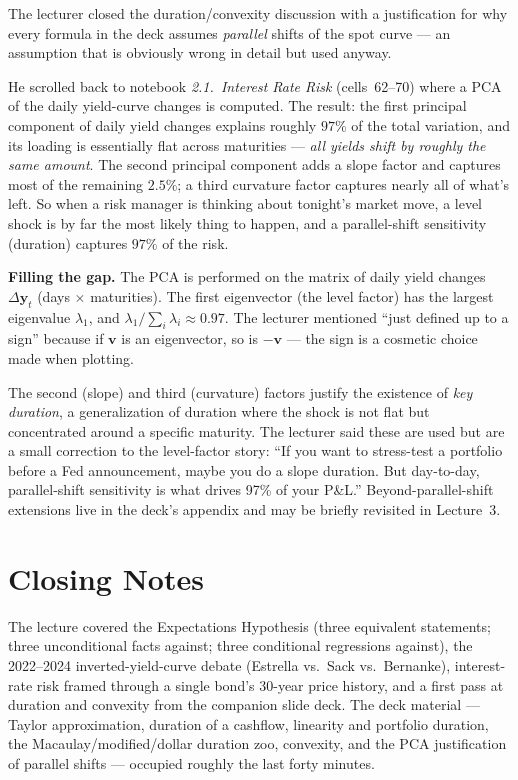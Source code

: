 The lecturer closed the duration/convexity discussion with a justification for
why every formula in the deck assumes \emph{parallel} shifts of the spot
curve --- an assumption that is obviously wrong in detail but used anyway.

He scrolled back to notebook \emph{2.1.~Interest Rate Risk} (cells~62--70)
where a PCA of the daily yield-curve changes is computed. The result: the
first principal component of daily yield changes explains roughly $97\%$ of
the total variation, and its loading is essentially flat across maturities
--- \emph{all yields shift by roughly the same amount}. The second principal
component adds a slope factor and captures most of the remaining $2.5\%$; a
third curvature factor captures nearly all of what's left. So when a risk
manager is thinking about tonight's market move, a level shock is by far
the most likely thing to happen, and a parallel-shift sensitivity (duration)
captures $97\%$ of the risk.

\begin{tipblock}
\textbf{Filling the gap.} The PCA is performed on the matrix of daily yield
changes $\Delta \boldsymbol{y}_t$ (days $\times$ maturities). The first
eigenvector (the level factor) has the largest eigenvalue $\lambda_1$, and
$\lambda_1 / \sum_i \lambda_i \approx 0.97$. The lecturer mentioned ``just
defined up to a sign'' because if $\mathbf{v}$ is an eigenvector, so is
$-\mathbf{v}$ --- the sign is a cosmetic choice made when plotting.
\end{tipblock}

The second (slope) and third (curvature) factors justify the existence of
\emph{key duration}, a generalization of duration where the shock is not
flat but concentrated around a specific maturity. The lecturer said these
are used but are a small correction to the level-factor story: ``If you want
to stress-test a portfolio before a Fed announcement, maybe you do a slope
duration. But day-to-day, parallel-shift sensitivity is what drives 97\% of
your P\&L.'' Beyond-parallel-shift extensions live in the deck's appendix
and may be briefly revisited in Lecture~3.

\section*{Closing Notes}

The lecture covered the Expectations Hypothesis (three equivalent
statements; three unconditional facts against; three conditional regressions
against), the 2022--2024 inverted-yield-curve debate (Estrella vs.\ Sack
vs.\ Bernanke), interest-rate risk framed through a single bond's 30-year
price history, and a first pass at duration and convexity from the
companion slide deck. The deck material --- Taylor approximation, duration
of a cashflow, linearity and portfolio duration, the Macaulay/modified/dollar
duration zoo, convexity, and the PCA justification of parallel shifts ---
occupied roughly the last forty minutes.

